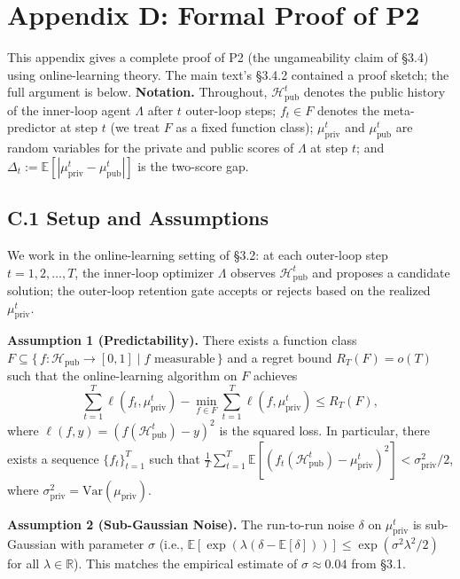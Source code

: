 \documentclass{article}
\theoremstyle{definition}
\begin{document}

\section*{Appendix D: Formal Proof of P2}

This appendix gives a complete proof of P2 (the ungameability claim of \S3.4) using online-learning theory. The main text's \S3.4.2 contained a proof sketch; the full argument is below. \textbf{Notation.} Throughout, $\mathcal{H}_{\text{pub}}^t$ denotes the public history of the inner-loop agent $\Lambda$ after $t$ outer-loop steps; $f_t \in F$ denotes the meta-predictor at step $t$ (we treat $F$ as a fixed function class); $\mu_{\text{priv}}^t$ and $\mu_{\text{pub}}^t$ are random variables for the private and public scores of $\Lambda$ at step $t$; and $\Delta_t := \mathbb{E}[|\mu_{\text{priv}}^t - \mu_{\text{pub}}^t|]$ is the two-score gap.

\subsection*{C.1 Setup and Assumptions}

We work in the online-learning setting of \S3.2: at each outer-loop step $t = 1, 2, \ldots, T$, the inner-loop optimizer $\Lambda$ observes $\mathcal{H}_{\text{pub}}^t$ and proposes a candidate solution; the outer-loop retention gate accepts or rejects based on the realized $\mu_{\text{priv}}^t$.

\textbf{Assumption 1 (Predictability).} There exists a function class $F \subseteq \{\,f : \mathcal{H}_{\text{pub}} \to [0,1] \mid f \text{ measurable}\,\}$ and a regret bound $R_T(F) = o(T)$ such that the online-learning algorithm on $F$ achieves
\[
\sum_{t=1}^{T} \ell(f_t, \mu_{\text{priv}}^t) - \min_{f \in F} \sum_{t=1}^{T} \ell(f, \mu_{\text{priv}}^t) \le R_T(F),
\]
where $\ell(f, y) = (f(\mathcal{H}_{\text{pub}}^t) - y)^2$ is the squared loss. In particular, there exists a sequence $\{f_t\}_{t=1}^T$ such that $\frac{1}{T} \sum_{t=1}^{T} \mathbb{E}[(f_t(\mathcal{H}_{\text{pub}}^t) - \mu_{\text{priv}}^t)^2] < \sigma_{\text{priv}}^2 / 2$, where $\sigma_{\text{priv}}^2 = \mathrm{Var}(\mu_{\text{priv}})$.

\textbf{Assumption 2 (Sub-Gaussian Noise).} The run-to-run noise $\delta$ on $\mu_{\text{priv}}^t$ is sub-Gaussian with parameter $\sigma$ (i.e., $\mathbb{E}[\exp(\lambda(\delta - \mathbb{E}[\delta]))] \le \exp(\sigma^2 \lambda^2 / 2)$ for all $\lambda \in \mathbb{R}$). This matches the empirical estimate of $\sigma \approx 0.04$ from \S3.1.
\end{document}
